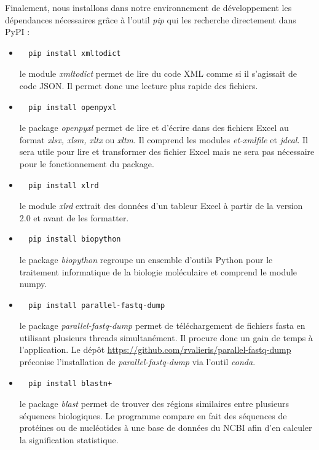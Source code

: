\documentclass[twoside,a4paper,11pt,frenchb,openany]{report}
\begin{document}
Finalement, nous installons dans notre environnement de développement les dépendances nécessaires grâce à l'outil \textit{pip} qui les recherche directement dans PyPI :
\begin{itemize}
\item \begin{verbatim}  pip install xmltodict\end{verbatim}
le module \textit{xmltodict} permet de lire du code XML comme si il s'agissait de code JSON. Il permet donc une lecture plus rapide des fichiers.
\item  \begin{verbatim}  pip install openpyxl\end{verbatim}
le package \textit{openpyxl} permet de lire et d'écrire dans des fichiers Excel au format \textit{xlsx, xlsm, xltx} ou \textit{xltm}. Il comprend les modules \textit{et-xmlfile} et \textit{jdcal}. Il sera utile pour lire et transformer des fichier Excel mais ne sera pas nécessaire pour le fonctionnement du package.
\item  \begin{verbatim}  pip install xlrd\end{verbatim}
le module \textit{xlrd} extrait des données d'un tableur Excel à partir de la version 2.0 et avant de les formatter.
\item  \begin{verbatim}  pip install biopython\end{verbatim}
le package \textit{biopython} regroupe un ensemble d'outils Python pour le traitement informatique de la biologie moléculaire et comprend le module numpy.
\item \begin{verbatim}  pip install parallel-fastq-dump\end{verbatim}
le package \textit{parallel-fastq-dump} permet de téléchargement de fichiers fasta en utilisant plusieurs threads simultanément. Il procure donc un gain de temps à l'application. Le dépôt \url{https://github.com/rvalieris/parallel-fastq-dump} préconise l'installation de \textit{parallel-fastq-dump} via l'outil \textit{conda}.
\item \begin{verbatim}  pip install blastn+\end{verbatim}
le package \textit{blast} permet de trouver des régions similaires entre plusieurs séquences biologiques. Le programme compare en fait des séquences de protéines ou de nucléotides à une base de données du NCBI afin d'en calculer la signification statistique.
\end{itemize}
\end{document}
